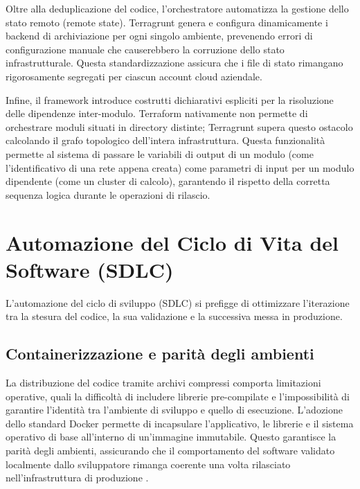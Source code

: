 Oltre alla deduplicazione del codice, l'orchestratore automatizza la gestione dello stato remoto (remote state). Terragrunt genera e configura dinamicamente i backend di archiviazione per ogni singolo ambiente, prevenendo errori di configurazione manuale che causerebbero la corruzione dello stato infrastrutturale. Questa standardizzazione assicura che i file di stato rimangano rigorosamente segregati per ciascun account cloud aziendale.

Infine, il framework introduce costrutti dichiarativi espliciti per la risoluzione delle dipendenze inter-modulo. Terraform nativamente non permette di orchestrare moduli situati in directory distinte; Terragrunt supera questo ostacolo calcolando il grafo topologico dell'intera infrastruttura. Questa funzionalità permette al sistema di passare le variabili di output di un modulo (come l'identificativo di una rete appena creata) come parametri di input per un modulo dipendente (come un cluster di calcolo), garantendo il rispetto della corretta sequenza logica durante le operazioni di rilascio. \cite{Terragrunt}

\section{Automazione del Ciclo di Vita del Software (SDLC)}
\label{sec:sdlc}

L'automazione del ciclo di sviluppo (SDLC) si prefigge di ottimizzare l'iterazione tra la stesura del codice, la sua validazione e la successiva messa in produzione.

\subsection{Containerizzazione e parità degli ambienti}
La distribuzione del codice tramite archivi compressi comporta limitazioni operative, quali la difficoltà di includere librerie pre-compilate e l'impossibilità di garantire l'identità tra l'ambiente di sviluppo e quello di esecuzione. L'adozione dello standard Docker permette di incapsulare l'applicativo, le librerie e il sistema operativo di base all'interno di un'immagine immutabile. Questo garantisce la parità degli ambienti, assicurando che il comportamento del software validato localmente dallo sviluppatore rimanga coerente una volta rilasciato nell'infrastruttura di produzione \cite{DockerDoc}.

